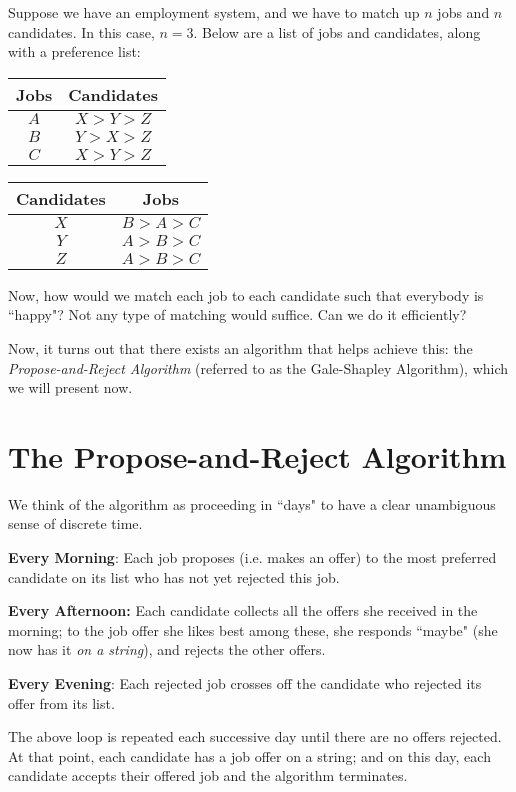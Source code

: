 \documentclass[openany]{book}
\begin{document}
\begin{defn}
	Suppose we have an employment system, and we have to match up $n$ jobs and $n$ candidates. In this case, $n=3$. Below are a list of jobs and candidates, along with a preference list:

	\begin{center}
		\begin{tabular}{|c|c|}
		\hline
		Jobs & Candidates \\
		\hline
		$A$ & $X > Y >Z$ \\
		\hline
		$B$ & $Y > X > Z$ \\
		\hline
		$C$ & $X > Y > Z$ \\
		\hline
		\end{tabular}
	
		\bigskip
		
		\begin{tabular}{|c|c|}
			\hline
			Candidates & Jobs \\
			\hline
			$X$ & $B > A > C$ \\
			\hline
			$Y$ & $A > B > C$ \\
			\hline
			$Z$ & $A > B > C$ \\
			\hline
		\end{tabular}
	\end{center}
	
	Now, how would we match each job to each candidate such that everybody is ``happy"? Not any type of matching would suffice. Can we do it efficiently?
\end{defn}

Now, it turns out that there exists an algorithm that helps achieve this: the \textit{Propose-and-Reject Algorithm} (referred to as the Gale-Shapley Algorithm), which we will present now.
\newpage

\section{The Propose-and-Reject Algorithm}
\begin{defn}
	We think of the algorithm as proceeding in ``days" to have a clear unambiguous sense of discrete time.
	
	\textbf{Every Morning}: Each job proposes (i.e. makes an offer) to the most preferred candidate on its list who has not yet rejected this job.
	
	\textbf{Every Afternoon:} Each candidate collects all the offers she received in the morning; to the job offer she likes best among these, she responds ``maybe" (she now has it \textit{on a string}), and rejects the other offers. 
	
	\textbf{Every Evening}: Each rejected job crosses off the candidate who rejected its offer from its list.
	
	The above loop is repeated each successive day until there are no offers rejected. At that point, each candidate has a job offer on a string; and on this day, each candidate accepts their offered job and the algorithm terminates.
\end{defn}
\end{document}
